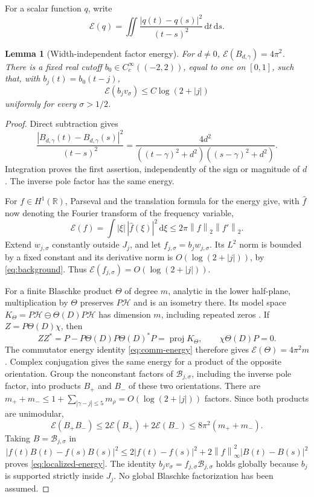 \documentclass[11pt]{article}
\numberwithin{equation}{section}
\newtheorem{lemma}[theorem]{Lemma}
\theoremstyle{definition}
\theoremstyle{remark}
\newcommand{\HH}{\mathcal H}
\newcommand{\norm}[1]{\left\lVert #1\right\rVert}
\newcommand{\dd}{\,\mathrm d}
\begin{document}
For a scalar function \(q\), write
\[
\mathcal E(q)=\iint
\frac{|q(t)-q(s)|^2}{(t-s)^2}\dd t\dd s.
\]

\begin{lemma}[Width-independent factor energy]\label{lem:energy}
For \(d\ne0\), \(\mathcal E(B_{d,\gamma})=4\pi^2\).
There is a fixed real cutoff \(b_0\in C_c^\infty((-2,2))\),
equal to one on \([0,1]\), such that, with \(b_j(t)=b_0(t-j)\),
\begin{equation}\label{eq:localized-energy}
\mathcal E(b_jv_\sigma)\le C\log(2+|j|)
\end{equation}
uniformly for every \(\sigma>1/2\).
\end{lemma}
\begin{proof}
Direct subtraction gives
\[
\frac{|B_{d,\gamma}(t)-B_{d,\gamma}(s)|^2}{(t-s)^2}
=\frac{4d^2}
{((t-\gamma)^2+d^2)((s-\gamma)^2+d^2)}.
\]
Integration proves the first assertion, independently of the sign
or magnitude of \(d\). The inverse pole factor has the same energy.

For \(f\in H^1(\mathbb R)\), Parseval and the translation formula
for the energy give, with \(\widehat f\) now denoting the Fourier
transform of the frequency variable,
\begin{equation}\label{eq:energy-interpolation}
\mathcal E(f)=\int |\xi|\,|\widehat f(\xi)|^2\dd\xi
\le2\pi\norm f_2\norm{f'}_2.
\end{equation}
Extend \(w_{j,\sigma}\) constantly outside \(J_j\), and let
\(f_{j,\sigma}=b_jw_{j,\sigma}\). Its \(L^2\) norm is bounded
by a fixed constant and its derivative norm is
\(O(\log(2+|j|))\), by \eqref{eq:background}. Thus
\(\mathcal E(f_{j,\sigma})=O(\log(2+|j|))\).

For a finite Blaschke product \(\Theta\) of degree \(m\), analytic
in the lower half-plane, multiplication by \(\Theta\) preserves
\(P\HH\) and is an isometry there. Its model space
\(K_\Theta=P\HH\ominus\Theta(D)P\HH\) has dimension \(m\),
including repeated zeros \cite{Peller}. If
\(Z=P\Theta(D)\chi\), then
\[
ZZ^*=P-P\Theta(D)P\Theta(D)^*P
=\operatorname{proj}K_\Theta,
\qquad \chi\Theta(D)P=0.
\]
The commutator energy identity \eqref{eq:comm-energy} therefore gives
\(\mathcal E(\Theta)=4\pi^2m\). Complex conjugation gives the same
energy for a product of the opposite orientation.
Group the nonconstant factors of \(\mathcal B_{j,\sigma}\), including
the inverse pole factor, into products \(B_+\) and \(B_-\) of these
two orientations. There are
\(m_++m_-\le1+\sum_{|\gamma-j|\le5}m_\rho=O(\log(2+|j|))\)
factors. Since both products are unimodular,
\[
\mathcal E(B_+B_-)
\le2\mathcal E(B_+)+2\mathcal E(B_-)
\le8\pi^2(m_++m_-).
\]
Taking \(B=\mathcal B_{j,\sigma}\) in
\[
|f(t)B(t)-f(s)B(s)|^2
\le2|f(t)-f(s)|^2+
2\norm f_\infty^2|B(t)-B(s)|^2
\]
proves \eqref{eq:localized-energy}. The identity
\(b_jv_\sigma=f_{j,\sigma}\mathcal B_{j,\sigma}\) holds globally
because \(b_j\) is supported strictly inside \(J_j\).
No global Blaschke factorization has been assumed.
\end{proof}
\end{document}
